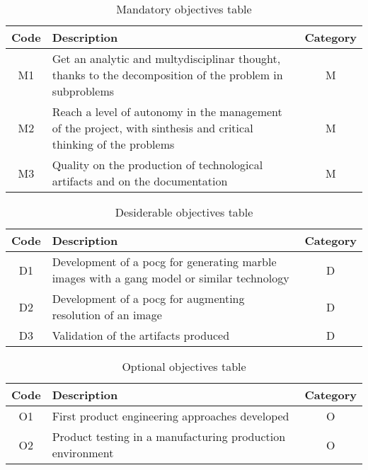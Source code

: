 \begin{table}[H] 
    \caption{Mandatory objectives table}
    \label{tab:man-objectives}
    \centering
    \begin{tabularx}{\textwidth}{|c|X|c|}
        \hline
        \textbf{Code} & \textbf{Description} & \textbf{Category}\\
        \hline
        M1 & Get an analytic and multydisciplinar thought, thanks to the decomposition of the problem in subproblems & M\\
        \hline
        M2 & Reach a level of autonomy in the management of the project, with sinthesis and critical thinking of the problems & M\\
        \hline
        M3 & Quality on the production of technological artifacts and on the documentation & M\\
    \end{tabularx}
\end{table}

\begin{table}[H] 
    \caption{Desiderable objectives table}
    \label{tab:des-objectives}
    \centering
    \begin{tabularx}{\textwidth}{|c|X|c|}
        \hline
        \textbf{Code} & \textbf{Description} & \textbf{Category}\\
        \hline
        D1 & Development of a \gls{pocg} for generating marble images with a \gls{gang} model or similar technology & D\\
        \hline
        D2 & Development of a \gls{pocg} for augmenting resolution of an image & D\\
        \hline
        D3 & Validation of the artifacts produced & D\\
    \end{tabularx}
\end{table}

\begin{table}[H] 
    \caption{Optional objectives table}
    \label{tab:opt-objectives}
    \centering
    \begin{tabularx}{\textwidth}{|c|X|c|}
        \hline
        \textbf{Code} & \textbf{Description} & \textbf{Category}\\
        \hline
        O1 & First product engineering approaches developed & O\\
        \hline
        O2 & Product testing in a manufacturing production environment & O\\
    \end{tabularx}
\end{table}
